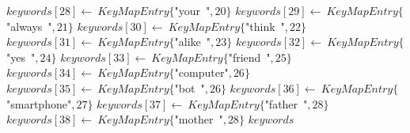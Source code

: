 \documentclass[a4paper,10pt]{article}
\begin{document}
\begin{algorithm}
\begin{algorithmic}[5]
  \STATE \(keywords[28]\gets\ KeyMapEntry\{\)"{}your\ "{}\(,20\}\)
  \STATE \(keywords[29]\gets\ KeyMapEntry\{\)"{}always\ "{}\(,21\}\)
  \STATE \(keywords[30]\gets\ KeyMapEntry\{\)"{}think\ "{}\(,22\}\)
  \STATE \(keywords[31]\gets\ KeyMapEntry\{\)"{}alike\ "{}\(,23\}\)
  \STATE \(keywords[32]\gets\ KeyMapEntry\{\)"{}yes\ "{}\(,24\}\)
  \STATE \(keywords[33]\gets\ KeyMapEntry\{\)"{}friend\ "{}\(,25\}\)
  \STATE \(keywords[34]\gets\ KeyMapEntry\{\)"{}computer"{}\(,26\}\)
  \STATE \(keywords[35]\gets\ KeyMapEntry\{\)"{}bot\ "{}\(,26\}\)
  \STATE \(keywords[36]\gets\ KeyMapEntry\{\)"{}smartphone"{}\(,27\}\)
  \STATE \(keywords[37]\gets\ KeyMapEntry\{\)"{}father\ "{}\(,28\}\)
  \STATE \(keywords[38]\gets\ KeyMapEntry\{\)"{}mother\ "{}\(,28\}\)
  \RETURN\(keywords\)

\end{algorithmic}
\end{algorithm}
\end{document}
